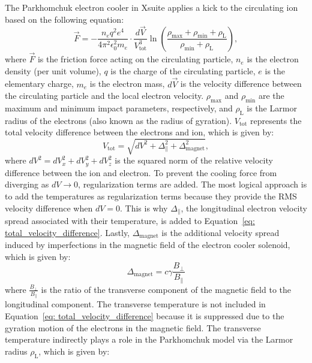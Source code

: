 The Parkhomchuk electron cooler in Xsuite applies a kick to the circulating ion based on the following equation:
%
\begin{equation}
\vec{F} = -\frac{n_e q^2 e^4}{4 \pi^2 \epsilon_0^2 m_e} \cdot \frac{d\vec{V}}{V^3_\text{tot}} \ln\left(\frac{\rho_{\max} + \rho_{\min} + \rho_{\mathrm{L}}}{\rho_{\min} + \rho_{\mathrm{L}}}\right),
\label{eq: parkhomchuk}
\end{equation}
%
where \( \vec{F} \) is the friction force acting on the circulating particle, \( n_{e} \) is the electron density (per unit volume), \( q \) is the charge of the circulating particle, \( e \) is the elementary charge, \( m_e \) is the electron mass, \( d\vec{V} \) is the velocity difference between the circulating particle and the local electron velocity. \( \rho_{\max} \) and \( \rho_{\min} \) are the maximum and minimum impact parameters, respectively, and \( \rho_{\mathrm{L}} \) is the Larmor radius of the electrons (also known as the radius of gyration). $V_{\text{tot}}$ represents the total velocity difference between the electrons and ion, which is given by:
%
\begin{equation}
V_{\text{tot}} = \sqrt{dV^2 + \Delta_{\parallel}^2 + \Delta_\text{magnet}^2},
\label{eq: total_velocity_difference}
\end{equation}
%
where \( dV^2 = dV_x^2 + dV_y^2 + dV_z^2 \) is the squared norm of the relative velocity difference between the ion and electron. To prevent the cooling force from diverging as \( dV \to 0 \), regularization terms are added. The most logical approach is to add the temperatures as regularization terms because they provide the RMS velocity difference when \( dV = 0 \). This is why \( \Delta_{\parallel} \), the longitudinal electron velocity spread associated with their temperature, is added to Equation~\eqref{eq: total_velocity_difference}. Lastly, \( \Delta_\text{magnet} \) is the additional velocity spread induced by imperfections in the magnetic field of the electron cooler solenoid, which is given by:
\begin{equation}
\Delta_\text{magnet} = c \gamma \frac{B_\perp}{B_\parallel}
\end{equation}
where \( \frac{B_\perp}{B_\parallel} \) is the ratio of the transverse component of the magnetic field to the longitudinal component. The transverse temperature is not included in Equation~\eqref{eq: total_velocity_difference} because it is suppressed due to the gyration motion of the electrons in the magnetic field. The transverse temperature indirectly plays a role in the Parkhomchuk model via the Larmor radius \( \rho_\text{L} \), which is given by:
